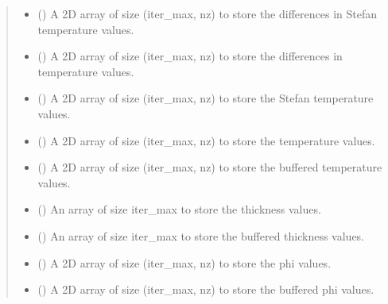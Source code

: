 \documentclass[a4paper,11pt,english,openany]{sphinxmanual}
\begin{document}
\begin{fulllineitems}
\begin{fulllineitems}
\begin{quote}
\begin{description}
\begin{itemize}
\item {} 
\sphinxAtStartPar
{} () \textendash{} A 2D array of size (iter\_max, nz) to store the differences in Stefan temperature values.

\item {} 
\sphinxAtStartPar
{} () \textendash{} A 2D array of size (iter\_max, nz) to store the differences in temperature values.

\item {} 
\sphinxAtStartPar
{} () \textendash{} A 2D array of size (iter\_max, nz) to store the Stefan temperature values.

\item {} 
\sphinxAtStartPar
{} () \textendash{} A 2D array of size (iter\_max, nz) to store the temperature values.

\item {} 
\sphinxAtStartPar
{} () \textendash{} A 2D array of size (iter\_max, nz) to store the buffered temperature values.

\item {} 
\sphinxAtStartPar
{} () \textendash{} An array of size iter\_max to store the thickness values.

\item {} 
\sphinxAtStartPar
{} () \textendash{} An array of size iter\_max to store the buffered thickness values.

\item {} 
\sphinxAtStartPar
{} () \textendash{} A 2D array of size (iter\_max, nz) to store the phi values.

\item {} 
\sphinxAtStartPar
{} () \textendash{} A 2D array of size (iter\_max, nz) to store the buffered phi values.


\end{itemize}
\end{description}
\end{quote}
\end{fulllineitems}
\end{fulllineitems}
\end{document}
